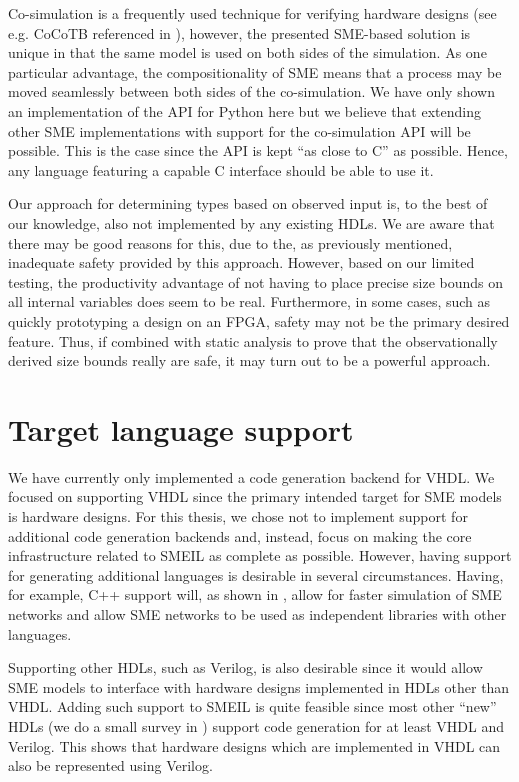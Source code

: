 Co-simulation is a frequently used technique for verifying hardware designs (see
e.g. CoCoTB referenced in ), however, the presented SME-based
solution is unique in that the same model is used on both sides of the
simulation. As one particular advantage, the compositionality of SME means that
a process may be moved seamlessly between both sides of the co-simulation.  We
have only shown an implementation of the API for Python here but we believe that
extending other SME implementations with support for the \libsme{} co-simulation
API will be possible. This is the case since the API is kept ``as close to C''
as possible. Hence, any language featuring a capable C interface should be able
to use it.


Our approach for determining types based on observed input is, to the best of
our knowledge, also not implemented by any existing HDLs. We are aware that
there may be good reasons for this, due to the, as previously mentioned,
inadequate safety provided by this approach. However, based on our limited
testing, the productivity advantage of not having to place precise size bounds
on all internal variables does seem to be real. Furthermore, in some cases, such
as quickly prototyping a design on an FPGA, safety may not be the primary
desired feature. Thus, if combined with static analysis to prove that the
observationally derived size bounds really are safe, it may turn out to be a
powerful approach.

\section{Target language support}
We have currently only implemented a code generation backend for VHDL. We
focused on supporting VHDL since the primary intended target for SME models is
hardware designs. For this thesis, we chose not to implement support for
additional code generation backends and, instead, focus on making the core
infrastructure related to SMEIL as complete as possible. However, having support
for generating additional languages is desirable in several
circumstances. Having, for example, C++ support will, as shown in
\cite{skovhede2017c++}, allow for faster simulation of SME networks and allow
SME networks to be used as independent libraries with other languages.

Supporting other HDLs, such as Verilog, is also desirable since it would allow
SME models to interface with hardware designs implemented in HDLs other than
VHDL. Adding such support to SMEIL is quite feasible since most other ``new''
HDLs (we do a small survey in ) support code generation for at
least VHDL and Verilog. This shows that hardware designs which are implemented
in VHDL can also be represented using Verilog.

